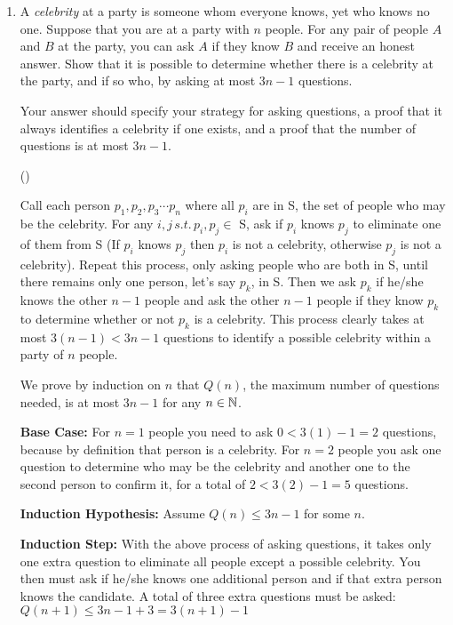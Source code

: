 \documentclass[11pt,fleqn]{article}
\begin{document}
\begin{enumerate}
\newpage
\item A \emph{celebrity} at a party is someone whom everyone
knows, yet who knows no one.
Suppose that you are at a party with $n$ people.
For any pair of people $A$ and $B$ at the party,
you can ask $A$ if they know $B$ and receive 
an honest answer.
Show that it is possible to determine whether there is a celebrity at the party,
and if so who, by asking at most $3n - 1$ questions.

Your answer should specify your strategy for asking questions, a proof that it
always identifies a celebrity if one exists, and a proof that the number of questions
is at most $3n-1$. 

()

Call each person $p_1, p_2, p_3 \cdots p_n$ where all $p_i$ are in S, the set of people who may be the celebrity.
For any $i, j \, s.t. \, p_i, p_j \in$ S, ask if $p_i$ knows $p_j$ to eliminate one of them from S (If $p_i$ knows $p_j$
then $p_i$ is not a celebrity, otherwise $p_j$ is not a celebrity). Repeat this process, only asking people who
are both in S, until there remains only one person, let's say $p_k$, in S. Then we ask $p_k$ if he/she knows the
other $n-1$ people and ask the other $n-1$ people if they know $p_k$ to determine whether or not $p_k$ is a celebrity.
This process clearly takes at most $3(n-1) < 3n-1$ questions to identify a possible celebrity within a party of $n$
people.

We prove by induction on $n$ that $Q(n)$, the maximum number of questions needed, is at most $3n-1$ for any $n \in \mathbb{N}$.

{\bf Base Case:} For $n=1$ people you need to ask $0 < 3(1)-1 = 2$ questions, because by definition that person is
    a celebrity. For $n=2$ people you ask one question to determine who may be the celebrity and another one to the
    second person to confirm it, for a total of $2 < 3(2)-1 = 5$ questions.

{\bf Induction Hypothesis:} Assume $Q(n) \leq 3n-1$ for some $n$.

{\bf Induction Step:} With the above process of asking questions, it takes only one extra question to eliminate all
    people except a possible celebrity. You then must ask if he/she knows one additional person and if that extra
    person knows the candidate. A total of three extra questions must be asked: $Q(n+1) \leq 3n-1+3 = 3(n+1)-1$


\end{enumerate}
\end{document}
